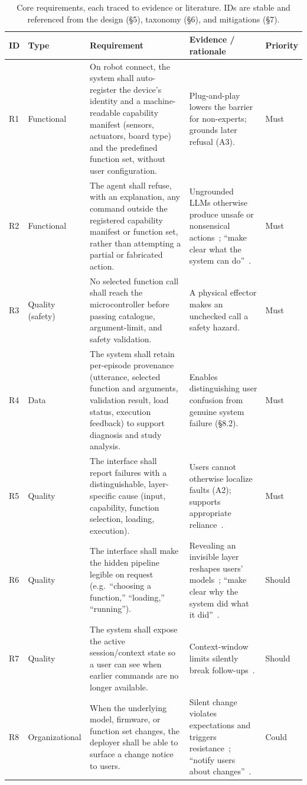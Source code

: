 \documentclass[sigconf]{acmart}
\begin{document}
\begin{table}[t]
  \caption{Core requirements, each traced to evidence or literature. IDs are stable and referenced from the design (\S5), taxonomy (\S6), and mitigations (\S7).}
  \label{tab:req}
  \small
  \begin{tabular}{@{}p{0.7cm}p{1.7cm}p{7.6cm}p{4.3cm}p{1.2cm}@{}}
    \toprule
    ID & Type & Requirement & Evidence / rationale & Priority \\
    \midrule
    R1 & Functional & On robot connect, the system shall auto-register the device's identity and a machine-readable capability manifest (sensors, actuators, board type) and the predefined function set, without user configuration. & Plug-and-play lowers the barrier for non-experts; grounds later refusal (A3). & Must \\
    R2 & Functional & The agent shall refuse, with an explanation, any command outside the registered capability manifest or function set, rather than attempting a partial or fabricated action. & Ungrounded LLMs otherwise produce unsafe or nonsensical actions~\cite{ahn2022saycan}; ``make clear what the system can do''~\cite{amershi2019guidelines}. & Must \\
    R3 & Quality (safety) & No selected function call shall reach the microcontroller before passing catalogue, argument-limit, and safety validation. & A physical effector makes an unchecked call a safety hazard. & Must \\
    R4 & Data & The system shall retain per-episode provenance (utterance, selected function and arguments, validation result, load status, execution feedback) to support diagnosis and study analysis. & Enables distinguishing user confusion from genuine system failure (\S8.2). & Must \\
    R5 & Quality & The interface shall report failures with a distinguishable, layer-specific cause (input, capability, function selection, loading, execution). & Users cannot otherwise localize faults (A2); supports appropriate reliance~\cite{lee2004trust}. & Must \\
    R6 & Quality & The interface shall make the hidden pipeline legible on request (e.g.\ ``choosing a function,'' ``loading,'' ``running''). & Revealing an invisible layer reshapes users' models~\cite{eslami2015always}; ``make clear why the system did what it did''~\cite{amershi2019guidelines}. & Should \\
    R7 & Quality & The system shall expose the active session/context state so a user can see when earlier commands are no longer available. & Context-window limits silently break follow-ups~\cite{liu2024lost}. & Should \\
    R8 & Organizational & When the underlying model, firmware, or function set changes, the deployer shall be able to surface a change notice to users. & Silent change violates expectations and triggers resistance~\cite{devito2017algorithms}; ``notify users about changes''~\cite{amershi2019guidelines}. & Could \\
    \bottomrule
  \end{tabular}
\end{table}
\end{document}
